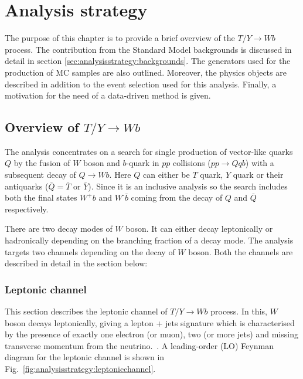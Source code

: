 


\chapter{Analysis strategy}
\label{sec:analysisstrategy}
The purpose of this chapter is to provide a brief overview of the $T/Y\rightarrow Wb$ process. The contribution from the Standard Model backgrounds is discussed in detail in section \ref{sec:analysisstrategy:backgrounds}. The generators used for the production of MC samples are also outlined. Moreover, the physics objects are described in addition to the event selection used for this analysis. Finally, a motivation for the need of a data-driven method is given.

\section{Overview of $T/Y\rightarrow Wb$ }%
\label{sec:analysisstrategy:t/y}
The analysis concentrates on a search for single production of vector-like quarks $Q$ by the fusion of $W$ boson and $b$-quark in $pp$ collisions ($pp\rightarrow Qqb$) with a subsequent decay of $Q \rightarrow Wb$. Here $Q$ can either be $T$ quark, $Y$ quark or their antiquarks ($\bar{Q}=\bar{T}\text{ or }\bar{Y}$). Since it is an inclusive analysis so the search includes both the final states $W^{\text{+}}b$ and $W^{\text{-}}\bar{b}$ coming from the decay of $Q$ and $\bar{Q}$ respectively.

There are two decay modes of $W$ boson. It can either decay leptonically or hadronically depending on the branching fraction of a decay mode. The analysis targets two channels depending on the decay of $W$ boson. Both the channels are described in detail in the section below:


\subsection{Leptonic channel}%
\label{sec:analysisstrategy:leptonicchannel}
This section describes the leptonic channel of $T/Y\rightarrow Wb$ process. In this, $W$ boson decays leptonically, giving a lepton + jets signature which is characterised by the presence of exactly one electron (or muon), two (or more jets) and missing transverse momentum from the neutrino.~\cite{vlqpaper}. A leading-order (LO) Feynman diagram for the leptonic channel is shown in Fig.\ \ref{fig:analysisstrategy:leptonicchannel}. 

